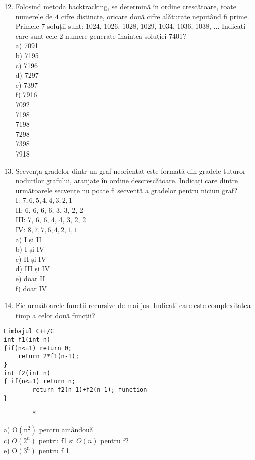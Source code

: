 \begin{enumerate}
  \setcounter{enumi}{11}
  \item Folosind metoda backtracking, se determină în ordine crescătoare, toate numerele de $\mathbf{4}$ cifre distincte, oricare două cifre alăturate neputând fi prime. Primele 7 soluții sunt: 1024, 1026, 1028, 1029, 1034, 1036, 1038, ... Indicați care sunt cele 2 numere generate înaintea soluției 7401?\\
a) 7091\\
b) 7195\\
c) 7196\\
d) 7297\\
e) 7397\\
f) 7916\\
7092\\
7198\\
7198\\
7298\\
7398\\
7918
  \item Secvența gradelor dintr-un graf neorientat este formată din gradele tuturor nodurilor grafului, aranjate în ordine descrescătoare. Indicați care dintre următoarele secvențe nu poate fi secvență a gradelor pentru niciun graf?\\
I: $7,6,5,4,4,3,2,1$\\
II: 6, 6, 6, 6, 3, 3, 2, 2\\
III: 7, 6, 6, 4, 4, 3, 2, 2\\
IV: $8,7,7,6,4,2,1,1$\\
a) I și II\\
b) I și IV\\
c) II și IV\\
d) III și IV\\
e) doar II\\
f) doar IV
  \item Fie următoarele funcții recursive de mai jos. Indicați care este complexitatea timp a celor două funcții?
\end{enumerate}

\begin{verbatim}
Limbajul C++/C
int f1(int n)
{if(n<=1) return 0;
    return 2*f1(n-1);
}
int f2(int n)
{ if(n<=1) return n;
        return f2(n-1)+f2(n-1); function
}
\end{verbatim}

\begin{verbatim}
        *
\end{verbatim}

a) $\mathrm{O}\left(\mathrm{n}^{2}\right)$ pentru amândouă\\
c) $O\left(2^{n}\right)$ pentru f1 și $O(n)$ pentru f2\\
e) $\mathrm{O}\left(3^{\mathrm{n}}\right)$ pentru f 1

